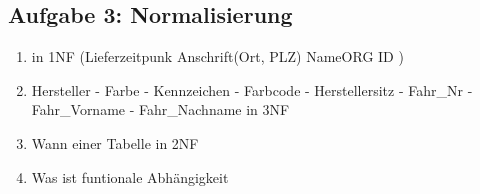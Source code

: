\subsection{Aufgabe 3: Normalisierung}
\label{sec:Aufgabe3}
\begin{enumerate}[label=\alph*)]
    \item in 1NF (Lieferzeitpunk Anschrift(Ort, PLZ) NameORG ID )
    \item Hersteller - Farbe - Kennzeichen - Farbcode - Herstellersitz - Fahr\_Nr - Fahr\_Vorname - Fahr\_Nachname in 3NF 
    \item Wann einer Tabelle in 2NF
    \item Was ist funtionale Abhängigkeit
\end{enumerate}
